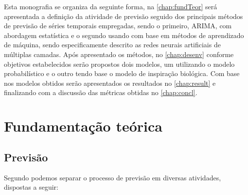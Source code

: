 \documentclass[
    12pt,
    oneside,
    a4paper,
    english,
    brazil
]{abntex2}
\begin{document}
Esta monografia se organiza da seguinte forma, na \autoref{chap:fundTeor} será
apresentada a definição da atividade de previsão seguido dos principais métodos
de previsão de séries temporais empregadas, sendo o primeiro, ARIMA, com
abordagem estatística e o segundo usando com base em métodos de aprendizado de
máquina, sendo especificamente descrito as redes neurais artificiais de
múltiplas camadas. Após apresentado os métodos, no \autoref{chap:desenv}
conforme objetivos estabelecidos serão propostos dois modelos, um utilizando o
modelo probabilístico e o outro tendo base o modelo de inspiração biológica.
Com base nos modelos obtidos serão apresentados os resultados no
\autoref{chap:result} e finalizando com a discussão das métricas obtidas no
\autoref{chap:concl}.

\chapter{Fundamentação teórica}\label{chap:fundTeor}

\section{Previsão}
Segundo  podemos separar o processo de previsão em diversas
atividades, dispostas a seguir:
\end{document}
